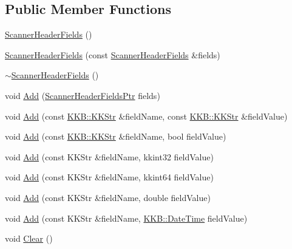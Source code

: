\subsection*{Public Member Functions}
\begin{DoxyCompactItemize}
\item 
\hyperlink{class_k_k_l_s_c_1_1_scanner_header_fields_a83003b4ad93d94c55f91382bdf6ab5e8}{Scanner\+Header\+Fields} ()
\item 
\hyperlink{class_k_k_l_s_c_1_1_scanner_header_fields_a18279435be2b7b40175c6ad8149c9579}{Scanner\+Header\+Fields} (const \hyperlink{class_k_k_l_s_c_1_1_scanner_header_fields}{Scanner\+Header\+Fields} \&fields)
\item 
\hyperlink{class_k_k_l_s_c_1_1_scanner_header_fields_aaef1aba28dfeda5afe0183a728d39462}{$\sim$\+Scanner\+Header\+Fields} ()
\item 
void \hyperlink{class_k_k_l_s_c_1_1_scanner_header_fields_ac9f7ce0167e98d29c896a258b0463ed5}{Add} (\hyperlink{class_k_k_l_s_c_1_1_scanner_header_fields_aedddcdf8b705aada0dd2c52cb6624c59}{Scanner\+Header\+Fields\+Ptr} fields)
\item 
void \hyperlink{class_k_k_l_s_c_1_1_scanner_header_fields_a291292a995d31a02d589789e56253316}{Add} (const \hyperlink{class_k_k_b_1_1_k_k_str}{K\+K\+B\+::\+K\+K\+Str} \&field\+Name, const \hyperlink{class_k_k_b_1_1_k_k_str}{K\+K\+B\+::\+K\+K\+Str} \&field\+Value)
\item 
void \hyperlink{class_k_k_l_s_c_1_1_scanner_header_fields_ae31b575a2ca3717c76d2e50c173b8e0d}{Add} (const \hyperlink{class_k_k_b_1_1_k_k_str}{K\+K\+B\+::\+K\+K\+Str} \&field\+Name, bool field\+Value)
\item 
void \hyperlink{class_k_k_l_s_c_1_1_scanner_header_fields_a65b36a8af5a9b063de19cdb6fade9a6b}{Add} (const K\+K\+Str \&field\+Name, kkint32 field\+Value)
\item 
void \hyperlink{class_k_k_l_s_c_1_1_scanner_header_fields_a876ba9b1336637de53721f340eb25447}{Add} (const K\+K\+Str \&field\+Name, kkint64 field\+Value)
\item 
void \hyperlink{class_k_k_l_s_c_1_1_scanner_header_fields_a3fd2e4c7ea26b2c3381206a11c45ca3e}{Add} (const K\+K\+Str \&field\+Name, double field\+Value)
\item 
void \hyperlink{class_k_k_l_s_c_1_1_scanner_header_fields_ad7ce6eff37cd0404095b362e98a3c2f1}{Add} (const K\+K\+Str \&field\+Name, \hyperlink{class_k_k_b_1_1_date_time}{K\+K\+B\+::\+Date\+Time} field\+Value)
\item 
void \hyperlink{class_k_k_l_s_c_1_1_scanner_header_fields_a6795535be06da13129f546709e38d47e}{Clear} ()

\end{DoxyCompactItemize}
